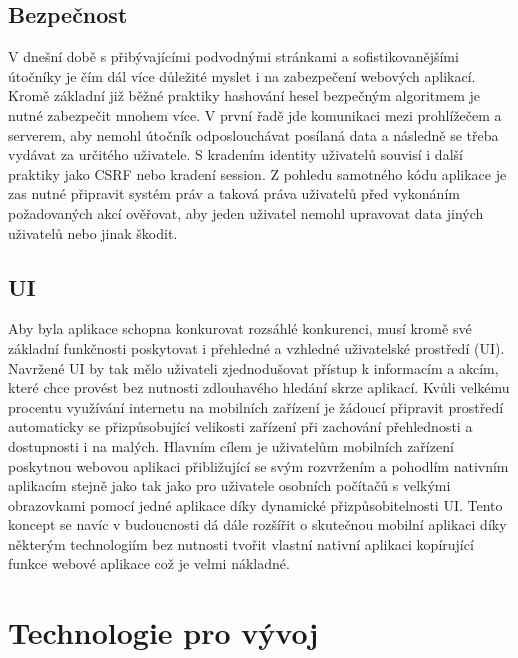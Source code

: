 	\subsection{Bezpečnost}

	V dnešní době s přibývajícími podvodnými stránkami a sofistikovanějšími útočníky je čím dál více důležité myslet i
	na zabezpečení webových aplikací.
	Kromě základní již běžné praktiky hashování hesel bezpečným algoritmem je nutné zabezpečit mnohem více.
	V první řadě jde komunikaci mezi prohlížečem a serverem, aby nemohl útočník odposlouchávat posílaná data a následně
	se třeba vydávat za určitého uživatele.
	S kradením identity uživatelů souvisí i další praktiky jako CSRF nebo kradení session.
	Z pohledu samotného kódu aplikace je zas nutné připravit systém práv a taková práva uživatelů před vykonáním
	požadovaných akcí ověřovat, aby jeden uživatel nemohl upravovat data jiných uživatelů nebo jinak škodit.

	\subsection{UI}

	Aby byla aplikace schopna konkurovat rozsáhlé konkurenci, musí kromě své základní funkčnosti poskytovat i přehledné
	a vzhledné uživatelské prostředí (\noindent\ac{UI}).
	Navržené \ac{UI} by tak mělo uživateli zjednodušovat přístup k informacím a akcím, které chce provést bez nutnosti
	zdlouhavého hledání skrze aplikací.
	Kvůli velkému procentu využívání internetu na mobilních zařízení je žádoucí připravit prostředí automaticky se
	přizpůsobující velikosti zařízení při zachování přehlednosti a dostupnosti i na malých.
	Hlavním cílem je uživatelům mobilních zařízení poskytnou webovou aplikaci přibližující se svým rozvržením a pohodlím
	nativním aplikacím stejně jako tak jako pro uživatele osobních počítačů s velkými obrazovkami pomocí jedné
	aplikace díky dynamické přizpůsobitelnosti \ac{UI}.
	Tento koncept se navíc v budoucnosti dá dále rozšířit o skutečnou mobilní aplikaci díky některým technologiím
	bez nutnosti tvořit vlastní nativní aplikaci kopírující funkce webové aplikace což je velmi nákladné.

\section{Technologie pro vývoj}

